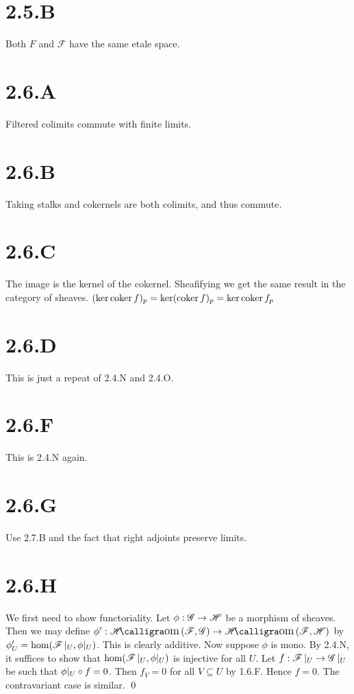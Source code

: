 \documentclass{article}
\begin{document}
\section*{2.5.B}
Both $F$ and $\mathscr{F}$ have the same etale
space.

\section*{2.6.A}
Filtered colimits commute with finite limits.

\section*{2.6.B}
Taking stalks and cokernels are both colimits, and thus commute.

\section*{2.6.C}
The image is the kernel of the cokernel. Sheafifying we get the same result in
the category of sheaves. $(\ker \operatorname{coker} f)_p=\ker (\operatorname{coker} f)_p = \ker \operatorname{coker} f_p$

\section*{2.6.D}
This is just a repeat of 2.4.N and 2.4.O.

\section*{2.6.F}
This is 2.4.N again.

\section*{2.6.G}
Use 2.7.B and the fact that right adjoints preserve limits.

\section*{2.6.H}
We first need to show functoriality. Let $\phi: \operatorname{\mathscr{G}} \to \operatorname{\mathscr{H}}$ be a morphism
of sheaves. Then we may define $\phi': \Hom(\Fsh, \Gsh) \to \Hom(\Fsh, \Hsh)$ by
$\phi'_U = \hom(\operatorname{\mathscr{F}}|_U, \phi|_U)$. This is clearly additive. Now suppose
$\phi$ is mono. By 2.4.N, it suffices to show that
$\hom(\operatorname{\mathscr{F}}|_U, \phi|_U)$ is injective for all $U$. Let
$f: \operatorname{\mathscr{F}}|_U \to \operatorname{\mathscr{G}}|_U$ be such that $\phi|_U \circ f = 0$. Then
$f_V=0$ for all $V \subseteq U$ by 1.6.F. Hence
$f=0$. The contravariant case is similar. \qed
\end{document}
